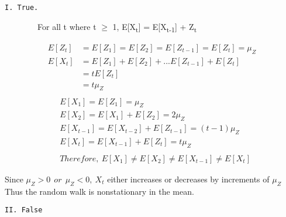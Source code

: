 \documentclass[
]{article}
\begin{document}
\setlength{\leftskip}{0cm}

\setlength{\leftskip}{2cm}

\begin{verbatim}
I. True. 
\end{verbatim}

~~~~~~~~For all t where t \(\ge\) 1, E{[}X\textsubscript{t}{]} =
E{[}X\textsubscript{t-1}{]} + Z\textsubscript{t}

\[ 
\begin{align*}
  E[Z_{t}] & = E[Z_{1}] = E[Z_{2}] = E[Z_{t-1}] = E[Z_{t}] =  \mu_{Z} \\
  E[X_{t}] & = E[Z_{1}] + E[Z_{2}] + ... E[Z_{t-1}] + E[Z_{t}] \\
  & = tE[Z_{t}] \\
  & = t\mu_{Z} \\
\end{align*} 
\] \[
\begin{aligned}
& E[X_{1}] = E[Z_{1}] = \mu_{Z}\\
& E[X_{2}] = E[X_{1}] + E[Z_{2}] = 2\mu_{Z}\\
& E[X_{t-1}] = E[X_{t-2}] + E[Z_{t-1}] = (t-1)\mu_{Z}\\
& E[X_{t}] = E[X_{t-1}] + E[Z_{t}] = t\mu_{Z}\\ \\
& Therefore,\ E[X_{1}] \neq E[X_{2}] \neq E[X_{t-1}] \neq E[X_{t}]
\end{aligned} 
\]

Since \(\mu_{Z} > 0\ \ or \ \ \mu_{Z} < 0,\ X_{t}\) either increases or
decreases by increments of \(\mu_{Z}\)\\
Thus the random walk is nonstationary in the mean.

\begin{verbatim}
II. False
\end{verbatim}
\end{document}
